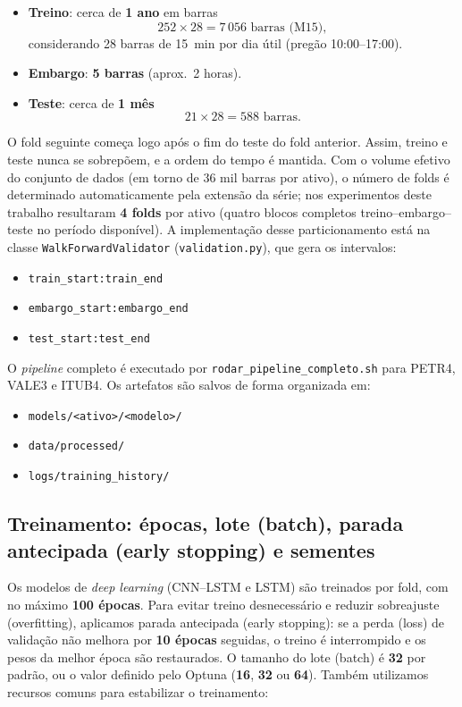 \begin{itemize}
  \item \textbf{Treino}: cerca de \textbf{1 ano} em barras
  \[
    252 \times 28 = 7\,056 \text{ barras (M15)},
  \]
  considerando 28 barras de 15~min por dia útil (pregão 10:00--17:00).
  \item \textbf{Embargo}: \textbf{5 barras} (aprox.\ 2 horas).
  \item \textbf{Teste}: cerca de \textbf{1 mês}
  \[
    21 \times 28 = 588 \text{ barras}.
  \]
\end{itemize}

O fold seguinte começa logo após o fim do teste do fold anterior.
Assim, treino e teste nunca se sobrepõem, e a ordem do tempo é mantida.
Com o volume efetivo do conjunto de dados (em torno de 36 mil barras por ativo), o número de folds é determinado
automaticamente pela extensão da série; nos experimentos deste trabalho resultaram \textbf{4 folds} por ativo
(quatro blocos completos treino--embargo--teste no período disponível).
A implementação desse particionamento está na classe
\texttt{WalkForwardValidator} (\texttt{validation.py}),
que gera os intervalos:

\begin{itemize}
  \item \texttt{train\_start:train\_end}
  \item \texttt{embargo\_start:embargo\_end}
  \item \texttt{test\_start:test\_end}
\end{itemize}

O \textit{pipeline} completo é executado por \texttt{rodar\_pipeline\_completo.sh}
para PETR4, VALE3 e ITUB4.
Os artefatos são salvos de forma organizada em:

\begin{itemize}
  \item \texttt{models/<ativo>/<modelo>/}
  \item \texttt{data/processed/}
  \item \texttt{logs/training\_history/}
\end{itemize}

\subsection{Treinamento: épocas, lote (batch), parada antecipada (early stopping) e sementes}
Os modelos de \textit{deep learning} (CNN--LSTM e LSTM) são treinados por fold,
com no máximo \textbf{100 épocas}.
Para evitar treino desnecessário e reduzir sobreajuste (overfitting),
aplicamos parada antecipada (early stopping):
se a perda (loss) de validação não melhora por \textbf{10 épocas} seguidas,
o treino é interrompido e os pesos da melhor época são restaurados.
O tamanho do lote (batch) é \textbf{32} por padrão,
ou o valor definido pelo Optuna (\textbf{16}, \textbf{32} ou \textbf{64}).
Também utilizamos recursos comuns para estabilizar o treinamento:

